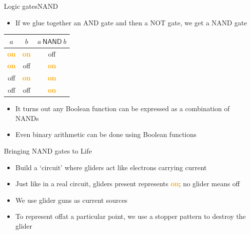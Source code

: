 \documentclass{beamer}
\newcommand{\on}[0]{\textcolor{orange}{\bf on}}
\newcommand{\off}[0]{off}
\begin{document}
\begin{frame}{Logic gates}{NAND}
	\begin{itemize}
		\item If we glue together an AND gate and then a NOT gate, we get a NAND gate
	\end{itemize}

	\begin{center}
		\begin{tabular}{c|c|c}
			$a$ & $b$ & $a ~\mathsf{NAND}~ b$ \\
			\hline
			\on & \on & \off \\
			\on & \off & \on \\
			\off & \on & \on \\
			\off & \off & \on
		\end{tabular}
	\end{center}

	\pause
	\begin{itemize}
		\item It turns out any Boolean function can be expressed as a combination of NANDs
		\item Even binary arithmetic can be done using Boolean functions
	\end{itemize}
\end{frame}

\begin{frame}{Bringing NAND gates to Life}
	\begin{itemize}
		\item Build a `circuit' where gliders act like electrons carrying current
		\item Just like in a real circuit, gliders present represents \on; no glider means \off
		\item We use glider guns as current sources
		\item To represent \off at a particular point, we use a stopper pattern to destroy the glider
	\end{itemize}
\end{frame}
\end{document}
